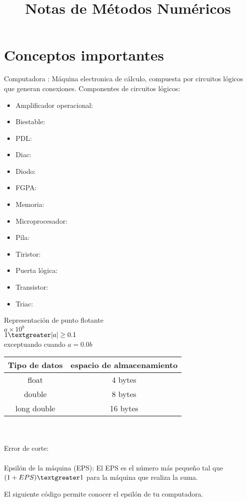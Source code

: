 \documentclass[a4paper]{article}
\title{
\vspace{-3em}
\begin{tcolorbox}[colframe=white,opacityback=0]
\begin{tcolorbox}
\Huge\sffamily Notas de Métodos Numéricos   
\end{tcolorbox}
\end{tcolorbox}
\vspace{-3em}
}
\date{}
\begin{document}
 
\maketitle

%
{\section{Conceptos importantes}}{Computadora : Máquina electronica de cálculo, compuesta por circuitos lógicos que generan conexiones.
Componentes de circuitos lógicos:
\begin{itemize}
\item Amplificador operacional:
\item Biestable:
\item PDL:
\item Diac:
\item Diodo:
\item FGPA: 
\item Memoria:
\item Microprocesador:
\item Pila:
\item Tiristor:
\item Puerta lógica:
\item Transistor:
\item Triac: 
\end{itemize}
%
}{%
Representaci\'on de punto flotante \\
$a \times 10^b$\\
$1 \textgreater |a| \geq 0.1$\\
exceptuando cuando $a=0.0b$ \\
\begin{tabular}{| c | c |}
\hline
Tipo de datos & espacio de almacenamiento\\
\hline 
float& 4 bytes\\
double & 8 bytes\\
long double & 16 bytes\\
\hline
\end{tabular}
\\ \\
Error de corte:
\\ \\
Epsil\'on de la m\'aquina (EPS): El EPS es el n\'umero m\'as pequeño tal que $(1+EPS)\textgreater1$ para la m\'aquina que realiza la suma.
}{El siguiente c\'odigo permite conocer el epsil\'on de tu computadora.}
\end{document}
